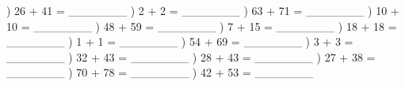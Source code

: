 \documentclass{article}%
\begin{document}
) 26 + 41 = \_\_\_\_\_\_\_%
\newline%
\newline%
) 2 + 2 = \_\_\_\_\_\_\_%
\newline%
\newline%
) 63 + 71 = \_\_\_\_\_\_\_%
\newline%
\newline%
) 10 + 10 = \_\_\_\_\_\_\_%
\newline%
\newline%
) 48 + 59 = \_\_\_\_\_\_\_%
\newline%
\newline%
) 7 + 15 = \_\_\_\_\_\_\_%
\newline%
\newline%
) 18 + 18 = \_\_\_\_\_\_\_%
\newline%
\newline%
) 1 + 1 = \_\_\_\_\_\_\_%
\newline%
\newline%
) 54 + 69 = \_\_\_\_\_\_\_%
\newline%
\newline%
) 3 + 3 = \_\_\_\_\_\_\_%
\newline%
\newline%
) 32 + 43 = \_\_\_\_\_\_\_%
\newline%
\newline%
) 28 + 43 = \_\_\_\_\_\_\_%
\newline%
\newline%
) 27 + 38 = \_\_\_\_\_\_\_%
\newline%
\newline%
) 70 + 78 = \_\_\_\_\_\_\_%
\newline%
\newline%
) 42 + 53 = \_\_\_\_\_\_\_%
\newline%
\end{document}
